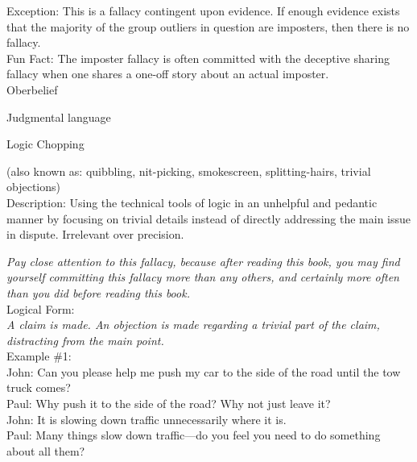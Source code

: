 \documentclass[a4paper,12pt,single,pdftex]{scrartcl}
\begin{document}
    
      Exception: This is a fallacy contingent upon evidence. If enough evidence exists that the majority of the group outliers in question are imposters, then there is no fallacy.
    \\

    
      Fun Fact: The imposter fallacy is often committed with the deceptive sharing fallacy when one shares a one-off story about an actual imposter.
    \\

  

Oberbelief

Judgmental language

Logic Chopping
    
      (also known as: quibbling, nit-picking, smokescreen, splitting-hairs, trivial objections)
    \\

  
    Description: Using the technical tools of logic in an unhelpful and pedantic manner by focusing on trivial details instead of directly addressing the main issue in dispute.  Irrelevant over precision.

    
      {\it Pay close attention to this fallacy, because after reading this book, you may find yourself committing this fallacy more than any others, and certainly more often than you did before reading this book.}
    \\

    
      Logical Form:{\it  \newline
}
    \\

    
      {\it A claim is made. \newline
An objection is made regarding a trivial part of the claim, distracting from the main point.}
    \\

    
      Example \#1:
    \\

    
      John: Can you please help me push my car to the side of the road until the tow truck comes?
    \\

    
      Paul: Why push it to the side of the road?  Why not just leave it?
    \\

    
      John: It is slowing down traffic unnecessarily where it is.
    \\

    
      Paul: Many things slow down traffic—do you feel you need to do something about all them?
    \\
\end{document}
